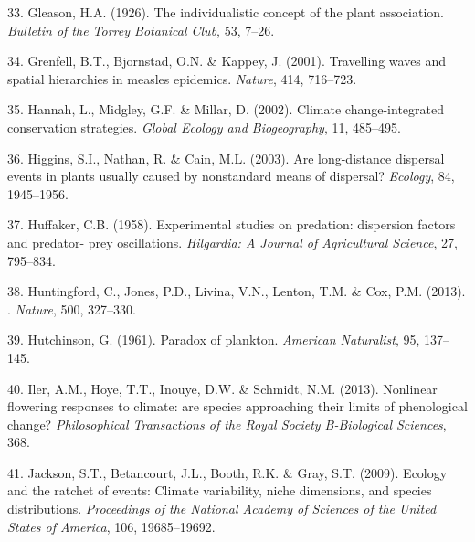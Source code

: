 \documentclass[11pt,a4paper,oneside]{article}
\begin{document}
\begin{thebibliography}{79}
33. Gleason, H.A. (1926).
\newblock The individualistic concept of the plant association.
\newblock \emph{Bulletin of the Torrey Botanical Club}, 53, 7--26.

34. Grenfell, B.T., Bjornstad, O.N. \& Kappey, J. (2001).
\newblock Travelling waves and spatial hierarchies in measles epidemics.
\newblock \emph{Nature}, 414, 716--723.

35. Hannah, L., Midgley, G.F. \& Millar, D. (2002).
\newblock Climate change-integrated conservation strategies.
\newblock \emph{Global Ecology and Biogeography}, 11, 485--495.

36. Higgins, S.I., Nathan, R. \& Cain, M.L. (2003).
\newblock Are long-distance dispersal events in plants usually caused by
  nonstandard means of dispersal?
\newblock \emph{Ecology}, 84, 1945--1956.

37. Huffaker, C.B. (1958).
\newblock Experimental studies on predation: dispersion factors and predator-
  prey oscillations.
\newblock \emph{Hilgardia: A Journal of Agricultural Science}, 27, 795--834.

38. Huntingford, C., Jones, P.D., Livina, V.N., Lenton, T.M. \& Cox, P.M. ({2013}).
.
\newblock \emph{Nature}, {500}, {327--330}.

39. Hutchinson, G. (1961).
\newblock Paradox of plankton.
\newblock \emph{American Naturalist}, 95, 137--145.

40. Iler, A.M., Hoye, T.T., Inouye, D.W. \& Schmidt, N.M. (2013).
\newblock Nonlinear flowering responses to climate: are species approaching
  their limits of phenological change?
\newblock \emph{Philosophical Transactions of the Royal Society B-Biological
  Sciences}, 368.

41. Jackson, S.T., Betancourt, J.L., Booth, R.K. \& Gray, S.T. (2009).
\newblock Ecology and the ratchet of events: Climate variability, niche
  dimensions, and species distributions.
\newblock \emph{Proceedings of the National Academy of Sciences of the United
  States of America}, 106, 19685--19692.


\end{thebibliography}
\end{document}
